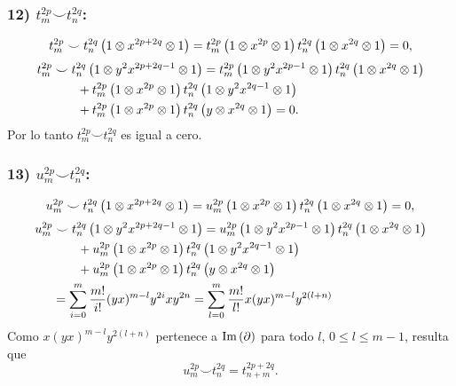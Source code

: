 \documentclass[fleqn,../tesis.tex]{subfiles}
\begin{document}
\subsubsection{12) $t_m^{2p} \smile t_n^{2q}$:}
\begin{align*}
	t_m^{2p}\smile t_n^{2q}\left(1\otimes x^{2p + 2q} \otimes 1\right)
		= t_m^{2p}\left(1\otimes x^{2p}\otimes 1\right)t_n^{2q}\left(1\otimes x^{2q}\otimes 1\right) = 0,
\end{align*}
\begin{align*}
	t_m^{2p} & \smile t_n^{2q}\left(1\otimes y^2x^{2p + 2q - 1} \otimes 1\right)
		= t_m^{2p}\left(1\otimes y^2x^{2p - 1}\otimes 1\right)t_n^{2q}\left(1\otimes x^{2q}\otimes 1\right)\\
	&\qquad + t_m^{2p}\left(1 \otimes x^{2p} \otimes 1\right)t_n^{2q}\left(1\otimes y^2x^{2q - 1}\otimes 1\right)\\
	&\qquad + t_m^{2p}\left(1 \otimes x^{2p} \otimes 1\right)t_n^{2q}\left(y\otimes x^{2q}\otimes 1\right) = 0.
\end{align*}
Por lo tanto $t_m^{2p}\smile t_n^{2q}$ es igual a cero.
\subsubsection{13) $u_m^{2p} \smile t_n^{2q}$:}
\begin{align*}
	u_m^{2p}\smile t_n^{2q}\left(1\otimes x^{2p + 2q} \otimes 1\right)
		= u_m^{2p}\left(1\otimes x^{2p}\otimes 1\right)t_n^{2q}\left(1\otimes x^{2q}\otimes 1\right) = 0,
\end{align*}
\begin{align*}
	u_m^{2p} & \smile t_n^{2q}\left(1\otimes y^2x^{2p + 2q - 1} \otimes 1\right)
		= u_m^{2p}\left(1\otimes y^2x^{2p - 1}\otimes 1\right)t_n^{2q}\left(1\otimes x^{2q}\otimes 1\right)\\
	&\qquad + u_m^{2p}\left(1 \otimes x^{2p} \otimes 1\right)t_n^{2q}\left(1\otimes y^2x^{2q - 1}\otimes 1\right)\\
	&\qquad + u_m^{2p}\left(1 \otimes x^{2p} \otimes 1\right)t_n^{2q}\left(y\otimes x^{2q}\otimes 1\right)\\
	&= \sum_{i = 0}^{m}\frac{m!}{i!}(yx)^{m - l}y^{2i}xy^{2n}
		= \sum_{l = 0}^{m}\frac{m!}{l!}x(yx)^{m - l}y^{2(l + n)}
\end{align*}
Como $x(yx)^{m - l}y^{2(l + n)}$ pertenece a $\operatorname{Im}\left(\partial\right)$ para todo $l$, $0 \leq l \leq m - 1$,
resulta que \[u_m^{2p}  \smile t_n^{2q} = t_{n + m}^{2p + 2q}.\]
\end{document}

